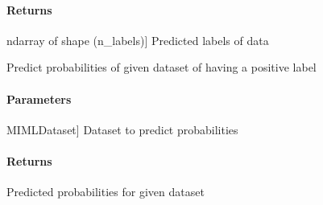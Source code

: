 \documentclass[letterpaper,10pt,english]{sphinxmanual}
\begin{document}
\begin{fulllineitems}
\begin{fulllineitems}
\begin{description}
\end{description}


\paragraph{Returns}
\label{\detokenize{classifier/mimlTOml/_autosummary/miml.classifier.mimlTOml.miml_to_ml_classifier.MIMLtoMLClassifier:id6}}\begin{description}
\sphinxlineitem{results}{[}ndarray of shape (n\_labels){]}
\sphinxAtStartPar
Predicted labels of data

\end{description}

\end{fulllineitems}


\begin{fulllineitems}
\label{\detokenize{classifier/mimlTOml/_autosummary/miml.classifier.mimlTOml.miml_to_ml_classifier.MIMLtoMLClassifier:miml.classifier.mimlTOml.miml_to_ml_classifier.MIMLtoMLClassifier.predict_proba}}
\pysigstartsignatures
{}
\pysigstopsignatures
\sphinxAtStartPar
Predict probabilities of given dataset of having a positive label


\paragraph{Parameters}
\label{\detokenize{classifier/mimlTOml/_autosummary/miml.classifier.mimlTOml.miml_to_ml_classifier.MIMLtoMLClassifier:id7}}\begin{description}
\sphinxlineitem{dataset\_test}{[}MIMLDataset{]}
\sphinxAtStartPar
Dataset to predict probabilities

\end{description}


\paragraph{Returns}
\label{\detokenize{classifier/mimlTOml/_autosummary/miml.classifier.mimlTOml.miml_to_ml_classifier.MIMLtoMLClassifier:id8}}\begin{description}
\sphinxAtStartPar
Predicted probabilities for given dataset

\end{description}

\end{fulllineitems}


\end{fulllineitems}
\end{document}
